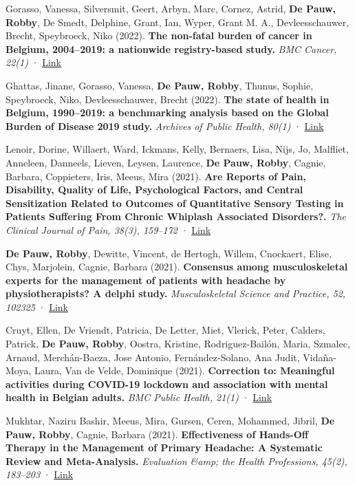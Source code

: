 \documentclass[
  letterpaper,
  DIV=11,
  numbers=noendperiod]{scrartcl}
\begin{document}
Gorasso, Vanessa, Silversmit, Geert, Arbyn, Marc, Cornez, Astrid,
\textbf{De Pauw, Robby}, De Smedt, Delphine, Grant, Ian, Wyper, Grant M.
A., Devleesschauwer, Brecht, Speybroeck, Niko (2022). \textbf{The
non-fatal burden of cancer in Belgium, 2004--2019: a nationwide
registry-based study.} \emph{BMC Cancer, 22(1)} ·
\href{http://dx.doi.org/10.1186/S12885-021-09109-4}{Link}

Ghattas, Jinane, Gorasso, Vanessa, \textbf{De Pauw, Robby}, Thunus,
Sophie, Speybroeck, Niko, Devleesschauwer, Brecht (2022). \textbf{The
state of health in Belgium, 1990--2019: a benchmarking analysis based on
the Global Burden of Disease 2019 study.} \emph{Archives of Public
Health, 80(1)} ·
\href{http://dx.doi.org/10.1186/S13690-022-00976-2}{Link}

Lenoir, Dorine, Willaert, Ward, Ickmans, Kelly, Bernaers, Lisa, Nijs,
Jo, Malfliet, Anneleen, Danneels, Lieven, Leysen, Laurence, \textbf{De
Pauw, Robby}, Cagnie, Barbara, Coppieters, Iris, Meeus, Mira (2021).
\textbf{Are Reports of Pain, Disability, Quality of Life, Psychological
Factors, and Central Sensitization Related to Outcomes of Quantitative
Sensory Testing in Patients Suffering From Chronic Whiplash Associated
Disorders?.} \emph{The Clinical Journal of Pain, 38(3), 159--172} ·
\href{http://dx.doi.org/10.1097/AJP.0000000000001013}{Link}

\textbf{De Pauw, Robby}, Dewitte, Vincent, de Hertogh, Willem,
Cnockaert, Elise, Chys, Marjolein, Cagnie, Barbara (2021).
\textbf{Consensus among musculoskeletal experts for the management of
patients with headache by physiotherapists? A delphi study.}
\emph{Musculoskeletal Science and Practice, 52, 102325} ·
\href{http://dx.doi.org/10.1016/J.MSKSP.2021.102325}{Link}

Cruyt, Ellen, De Vriendt, Patricia, De Letter, Miet, Vlerick, Peter,
Calders, Patrick, \textbf{De Pauw, Robby}, Oostra, Kristine,
Rodriguez-Bailón, Maria, Szmalec, Arnaud, Merchán-Baeza, Jose Antonio,
Fernández-Solano, Ana Judit, Vidaña-Moya, Laura, Van de Velde, Dominique
(2021). \textbf{Correction to: Meaningful activities during COVID-19
lockdown and association with mental health in Belgian adults.}
\emph{BMC Public Health, 21(1)} ·
\href{http://dx.doi.org/10.1186/S12889-021-11699-4}{Link}

Mukhtar, Naziru Bashir, Meeus, Mira, Gursen, Ceren, Mohammed, Jibril,
\textbf{De Pauw, Robby}, Cagnie, Barbara (2021). \textbf{Effectiveness
of Hands-Off Therapy in the Management of Primary Headache: A Systematic
Review and Meta-Analysis.} \emph{Evaluation \&amp; the Health
Professions, 45(2), 183--203} ·
\href{http://dx.doi.org/10.1177/0163278720983408}{Link}
\end{document}
